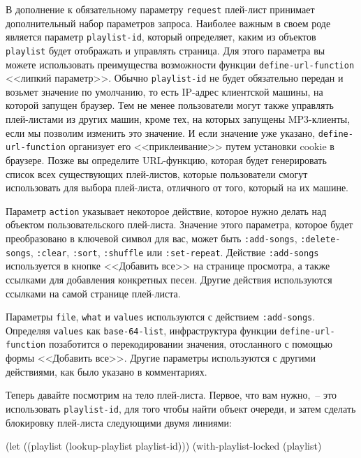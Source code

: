 В дополнение к обязательному параметру \lstinline{request} плей-лист принимает
дополнительный набор параметров запроса.  Наиболее важным в своем роде является параметр
\lstinline{playlist-id}, который определяет, каким из объектов \lstinline{playlist} будет
отображать и управлять страница. Для этого параметра вы можете использовать преимущества
возможности функции \lstinline{define-url-function} <<липкий параметр>>. Обычно
\lstinline{playlist-id} не будет обязательно передан и возьмет значение по умолчанию, то
есть IP-адрес клиентской машины, на которой запущен браузер. Тем не менее пользователи
могут также управлять плей-листами из других машин, кроме тех, на которых запущены
MP3-клиенты, если мы позволим изменить это значение. И если значение уже указано,
\lstinline{define-url-function} организует его <<приклеивание>> путем установки cookie в
браузере. Позже вы определите URL-функцию, которая будет генерировать список всех
существующих плей-листов, которые пользователи смогут использовать для выбора плей-листа,
отличного от того, который на их машине.

Параметр \lstinline{action} указывает некоторое действие, которое нужно делать над объектом
пользовательского плей-листа. Значение этого параметра, которое будет преобразовано в
ключевой символ для вас, может быть \lstinline{:add-songs}, \lstinline{:delete-songs},
\lstinline{:clear}, \lstinline{:sort}, \lstinline{:shuffle} или \lstinline{:set-repeat}. Действие
\lstinline{:add-songs} используется в кнопке <<Добавить все>> на странице просмотра, а также
ссылками для добавления конкретных песен. Другие действия используются ссылками на самой
странице плей-листа.

Параметры \lstinline{file}, \lstinline{what} и \lstinline{values} используются с действием
\lstinline{:add-songs}. Определяя \lstinline{values} как \lstinline{base-64-list}, инфраструктура функции
\lstinline{define-url-function} позаботится о перекодировании значения, отосланного с помощью
формы <<Добавить все>>. Другие параметры используются с другими действиями, как было указано
в комментариях.

Теперь давайте посмотрим на тело плей-листа. Первое, что вам нужно,~-- это использовать
\lstinline{playlist-id}, для того чтобы найти объект очереди, и затем сделать блокировку
плей-листа следующими двумя линиями:

\begin{myverb}
(let ((playlist (lookup-playlist playlist-id)))
  (with-playlist-locked (playlist)
\end{myverb}

